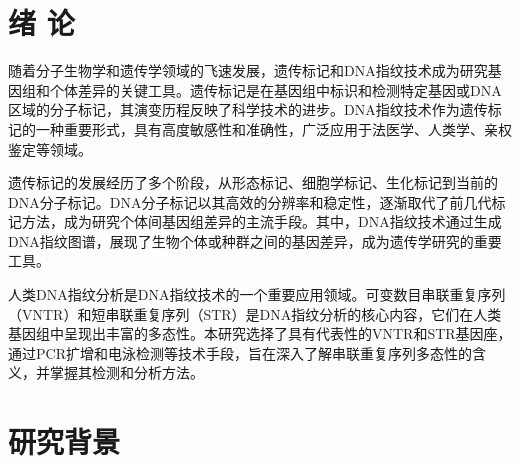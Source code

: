 \documentclass[AutoFakeBold]{LZUThesis}
\begin{document}
\customcontent




\mainmatter

\chapter{\texorpdfstring{绪 \quad 论}{绪论}}
随着分子生物学和遗传学领域的飞速发展，遗传标记和DNA指纹技术成为研究基因组和个体差异的关键工具。遗传标记是在基因组中标识和检测特定基因或DNA区域的分子标记，其演变历程反映了科学技术的进步。DNA指纹技术作为遗传标记的一种重要形式，具有高度敏感性和准确性，广泛应用于法医学、人类学、亲权鉴定等领域。

遗传标记的发展经历了多个阶段，从形态标记、细胞学标记、生化标记到当前的DNA分子标记。DNA分子标记以其高效的分辨率和稳定性，逐渐取代了前几代标记方法，成为研究个体间基因组差异的主流手段。其中，DNA指纹技术通过生成DNA指纹图谱，展现了生物个体或种群之间的基因差异，成为遗传学研究的重要工具。

人类DNA指纹分析是DNA指纹技术的一个重要应用领域。可变数目串联重复序列（VNTR）和短串联重复序列（STR）是DNA指纹分析的核心内容，它们在人类基因组中呈现出丰富的多态性。本研究选择了具有代表性的VNTR和STR基因座，通过PCR扩增和电泳检测等技术手段，旨在深入了解串联重复序列多态性的含义，并掌握其检测和分析方法。

\chapter{研究背景}
\end{document}
